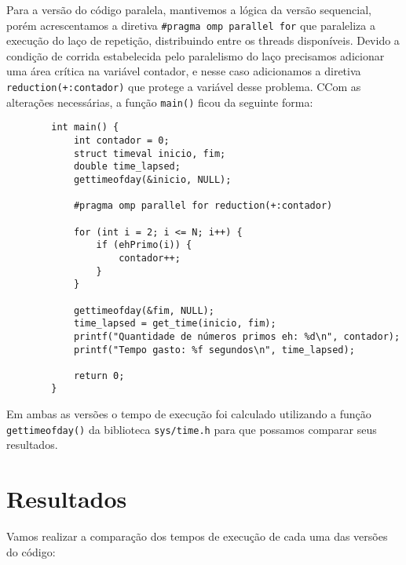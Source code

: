 \documentclass[a4paper, 12pt]{article}
\begin{document}
	Para a versão do código paralela, mantivemos a lógica da versão sequencial, porém acrescentamos a diretiva \texttt{\#pragma omp parallel for} que paraleliza a execução do laço de repetição, distribuindo entre os threads disponíveis. Devido a condição de corrida estabelecida pelo paralelismo do laço precisamos adicionar uma área crítica na variável contador, e nesse caso adicionamos a diretiva \texttt{reduction(+:contador)} que protege a variável desse problema. CCom as alterações necessárias, a função \texttt{main()} ficou da seguinte forma:
	
	\begin{verbatim}
		int main() {
		    int contador = 0;
		    struct timeval inicio, fim;
		    double time_lapsed;
		    gettimeofday(&inicio, NULL);
		    
		    #pragma omp parallel for reduction(+:contador)
		    
		    for (int i = 2; i <= N; i++) {
		        if (ehPrimo(i)) {
		            contador++;
		        }
		    }
			
		    gettimeofday(&fim, NULL); 
		    time_lapsed = get_time(inicio, fim);
		    printf("Quantidade de números primos eh: %d\n", contador);
		    printf("Tempo gasto: %f segundos\n", time_lapsed);
			
		    return 0;
		}
	\end{verbatim}
	
	
	Em ambas as versões o tempo de execução foi calculado utilizando a função \texttt{gettimeofday()} da biblioteca \texttt{sys/time.h} para que possamos comparar seus resultados.
	
	\section{Resultados}
	Vamos realizar a comparação dos tempos de execução de cada uma das versões do código:
	
\end{document}
